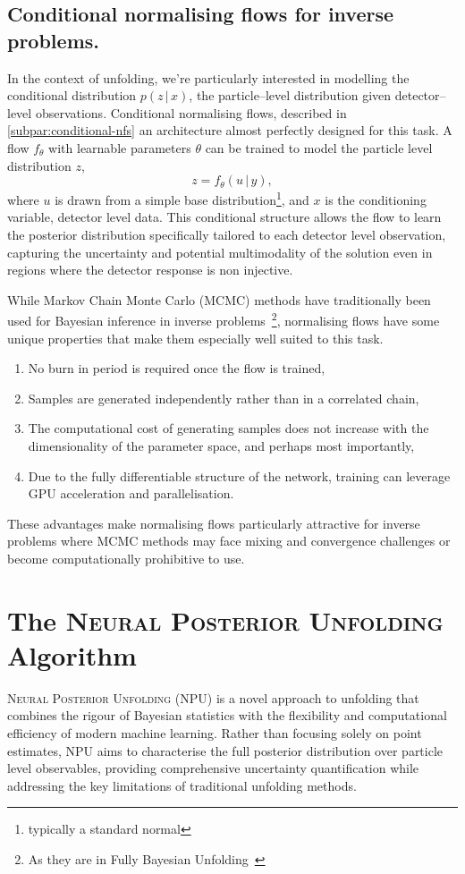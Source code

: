 \subsection{Conditional normalising flows for inverse problems.}
    In the context of unfolding, we're particularly interested in modelling the conditional distribution $p(z\,|\,x)$, the particle--level distribution given detector--level observations.
    Conditional normalising flows, described in \cref{subpar:conditional-nfs} an architecture almost perfectly designed for this task.
    A flow \(f_\theta\) with learnable parameters \(\theta\) can be trained to model the particle level distribution \(z\),
    \[
        z = f_\theta(u\,|\,y),
    \]
    where $u$ is drawn from a simple base distribution\footnote{typically a standard normal}, and $x$ is the conditioning variable, detector level data.
    This conditional structure allows the flow to learn the posterior distribution specifically tailored to each detector level observation, capturing the uncertainty and potential multimodality of the solution even in regions where the detector response is non injective.

    While Markov Chain Monte Carlo (MCMC) methods have traditionally been used for Bayesian inference in inverse problems~\cite{Kaipio2005StatisticalProblems, Segura2024APhysics, Dashti2017TheProblems, 2005InverseMeasurements, 2005StatisticalTheory}\footnote{As they are in Fully Bayesian Unfolding~\cite{choudalakis_fully_2012}}, normalising flows have some unique properties that make them especially well suited to this task.
    \begin{enumerate}
        \item  No burn in period is required once the flow is trained,
        \item Samples are generated independently rather than in a correlated chain,
        \item The computational cost of generating samples does not increase with the dimensionality of the parameter space, and perhaps most importantly,
        \item Due to the fully differentiable structure of the network, training can leverage GPU acceleration and parallelisation.
    \end{enumerate}
    
    These advantages make normalising flows particularly attractive for inverse problems where MCMC methods may face mixing and convergence challenges or become computationally prohibitive to use.
\section{The \textsc{Neural Posterior Unfolding} Algorithm}
    \textsc{Neural Posterior Unfolding} (NPU) is a novel approach to unfolding that combines the rigour of Bayesian statistics with the flexibility and computational efficiency of modern machine learning.
    Rather than focusing solely on point estimates, NPU aims to characterise the full posterior distribution over particle level observables, providing comprehensive uncertainty quantification while addressing the key limitations of traditional unfolding methods.
